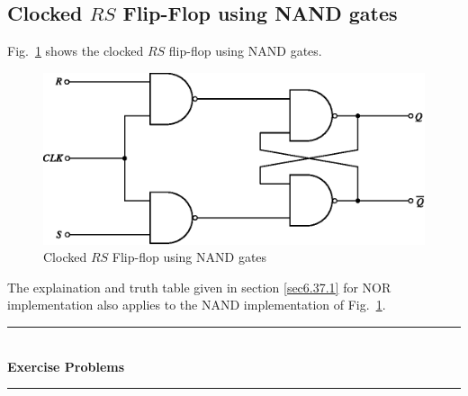 \newpage

\subsection{Clocked $RS$ Flip-Flop using NAND gates}\label{sec6.37.2}

Fig.~\ref{fig6.44} shows the clocked $RS$ flip-flop using NAND gates.
\begin{figure}[H]
\centering
\includegraphics{chap6/fig142.eps}
\caption{Clocked $RS$ Flip-flop using NAND gates}\label{fig6.44}
\end{figure}

The explaination and truth table given in section \ref{sec6.37.1} for NOR implementation also applies to the NAND implementation of Fig.~\ref{fig6.44}.

\smallskip
\begin{center}
\rule{5cm}{1pt}\\[-2pt]
{\bf Exercise Problems}\\[-4pt]
\rule{5cm}{1pt}
\end{center}

